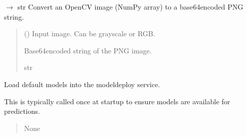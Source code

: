 \documentclass[letterpaper,10pt,english]{sphinxmanual}
\begin{document}
\begin{fulllineitems}
\label{\detokenize{modules/src.pig_sorting_api.main:src.pig_sorting_api.main.image_to_base64}}
\pysigstartsignatures
\pysiglinewithargsret
{}
{}
{{ $\rightarrow$ str}}
\pysigstopsignatures
\sphinxAtStartPar
Convert an OpenCV image (NumPy array) to a base64\sphinxhyphen{}encoded PNG string.
\begin{quote}\begin{description}
\sphinxAtStartPar
{} () \textendash{} Input image. Can be grayscale or RGB.

\sphinxAtStartPar
Base64\sphinxhyphen{}encoded string of the PNG image.

\sphinxAtStartPar
str

\end{description}\end{quote}

\end{fulllineitems}


\begin{fulllineitems}
\label{\detokenize{modules/src.pig_sorting_api.main:src.pig_sorting_api.main.load_default_models}}
\pysigstartsignatures
\pysiglinewithargsret
{}
{}
{}
\pysigstopsignatures
\sphinxAtStartPar
Load default models into the model\sphinxhyphen{}deploy service.

\sphinxAtStartPar
This is typically called once at startup to ensure models are available for predictions.
\begin{quote}\begin{description}
\sphinxAtStartPar
None

\end{description}\end{quote}

\end{fulllineitems}
\end{document}

